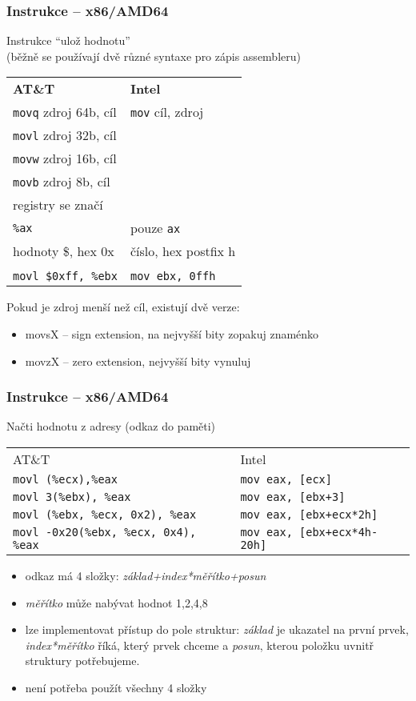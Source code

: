 \documentclass{beamer}
\begin{document}
\begin{frame}
\frametitle{Instrukce – x86/AMD64}
Instrukce ``ulož hodnotu''\\
(běžně se používají dvě různé syntaxe pro zápis assembleru)\\

\begin{tabular}{ l l }
\textbf{AT\&T} & \textbf{Intel}\\
\texttt{movq} zdroj 64b, cíl &	\texttt{mov} cíl, zdroj\\
\texttt{movl} zdroj 32b, cíl &\\
\texttt{movw} zdroj 16b, cíl &\\
\texttt{movb} zdroj 8b, cíl &\\
registry se značí &\\
\texttt{\%ax}	& pouze \texttt{ax}\\
hodnoty \$, hex 0x & číslo, hex postfix h\\
&\\
\texttt{movl \$0xff, \%ebx} & \texttt{mov ebx, 0ffh}\\
\end{tabular}

Pokud je zdroj menší než cíl, existují dvě verze:
\begin{itemize}
 \item movsX -- sign extension, na nejvyšší bity zopakuj znaménko
 \item movzX -- zero extension, nejvyšší bity vynuluj
\end{itemize}
 
\end{frame}


\begin{frame}
\frametitle{Instrukce – x86/AMD64}
Načti hodnotu z adresy (odkaz do paměti)\\
\begin{tabular}{ l l}
AT\&T & Intel \\
\texttt{movl (\%ecx),\%eax} & \texttt{mov eax, [ecx]}\\
\texttt{movl 3(\%ebx), \%eax} & \texttt{mov eax, [ebx+3]} \\
\texttt{movl (\%ebx, \%ecx, 0x2), \%eax} & \texttt{mov eax, [ebx+ecx*2h]} \\
\texttt{movl -0x20(\%ebx, \%ecx, 0x4), \%eax} & \texttt{mov eax, [ebx+ecx*4h-20h]} \\
\end{tabular}

\begin{itemize}
\item odkaz má 4 složky: \emph{základ+index*měřítko+posun}
\item \emph{měřítko} může nabývat hodnot 1,2,4,8
\item lze implementovat přístup do pole struktur: \emph{základ} je ukazatel na první prvek, \emph{index*měřítko} říká, který prvek chceme a \emph{posun}, kterou položku uvnitř struktury potřebujeme.
\item není potřeba použít všechny 4 složky 
\end{itemize}
\end{frame}
\end{document}
